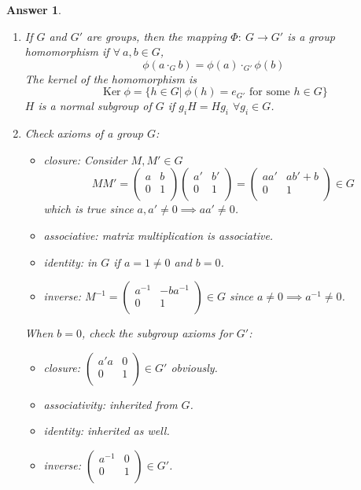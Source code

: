 \documentclass[a4paper]{article}
\DeclareMathOperator{\Ker}{Ker}
\newtheorem{ans}{Answer}[section]
\theoremstyle{new}
\begin{document}
\begin{ans}\leavevmode
\begin{enumerate}[label=(\alph*)]
\item If $G$ and $G'$ are groups, then the mapping $\Phi:~G\rightarrow G'$ is a group homomorphism if $\forall~a,b\in G$,
$$\phi(a\cdot_Gb)=\phi(a)\cdot_{G'}\phi(b)$$
The kernel of the homomorphism is
$$\Ker\phi=\{h\in G|~\phi(h)=e_{G'}\text{ for some } h\in G\}$$
$H$ is a normal subgroup of $G$ if $g_iH=Hg_i$ $\forall g_i\in G$.
\item Check axioms of a group $G$:
\begin{itemize}
    \item closure: Consider $M,M'\in G$ 
    $$MM'=\begin{pmatrix}a&b\\0&1\\\end{pmatrix}\begin{pmatrix}a'&b'\\0&1\\\end{pmatrix}=\begin{pmatrix}aa'&ab'+b\\0&1\\\end{pmatrix}\in G$$
    which is true since $a,a'\neq 0\implies aa'\neq 0$.
    \item associative: matrix multiplication is associative.
    \item identity: in $G$ if $a=1\neq 0$ and $b=0$.
    \item inverse: $M^{-1}=\begin{pmatrix}a^{-1}&-ba^{-1}\\0&1\\\end{pmatrix}\in G$ since $a\neq0\implies a^{-1}\neq 0$.
\end{itemize}
When $b=0$, check the subgroup axioms for $G'$:
\begin{itemize}
    \item closure: $\begin{pmatrix}a'a&0\\0&1\\\end{pmatrix}\in G'$ obviously.
    \item associativity: inherited from $G$.
    \item identity: inherited as well.
    \item inverse: $\begin{pmatrix}a^{-1}&0\\0&1\\\end{pmatrix}\in G'$.

\end{itemize}
\end{enumerate}
\end{ans}
\end{document}
